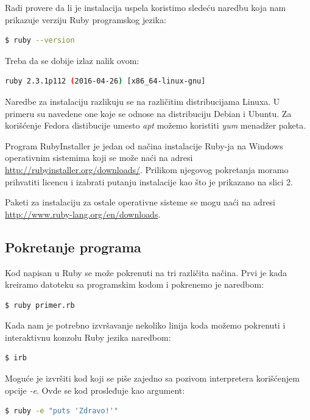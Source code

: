 \documentclass[a4paper]{article}
\begin{document}
Radi provere da li je instalacija uspela koristimo sledeću naredbu koja nam prikazuje verziju Ruby programskog jezika:

\begin{lstlisting}[language=bash]
  $ ruby --version
\end{lstlisting}\vspace*{-15pt}

Treba da se dobije izlaz nalik ovom:
\begin{lstlisting}[language=bash]
  ruby 2.3.1p112 (2016-04-26) [x86_64-linux-gnu]
\end{lstlisting}\vspace*{-15pt} 

Naredbe za instalaciju razlikuju se na različitim distribucijama Linuxa. U primeru su navedene one koje se odnose na distribuciju Debian i Ubuntu. Za korišćenje Fedora distibucije umesto \emph{apt} možemo koristiti \emph{yum} menadžer paketa.

Program RubyInstaller je jedan od načina instalacije Ruby-ja na Windows operativnim sistemima koji se može naći na adresi \url{http://rubyinstaller.org/downloads/}. Prilikom njegovog pokretanja moramo prihvatiti licencu i izabrati putanju instalacije kao što je prikazano na slici 2.

Paketi za instalaciju za ostale operativne sisteme se mogu naći na adresi \url{http://www.ruby-lang.org/en/downloads}.
\subsection{Pokretanje programa}
Kod napisan u Ruby se može pokrenuti na tri različita načina. Prvi je kada kreiramo datoteku sa programskim kodom i pokrenemo je naredbom:
\begin{lstlisting}[language=bash]
  $ ruby primer.rb
\end{lstlisting}\vspace*{-15pt}

Kada nam je potrebno izvršavanje nekoliko linija koda možemo pokrenuti i interaktivnu konzolu Ruby jezika naredbom:
\begin{lstlisting}[language=bash]
  $ irb
\end{lstlisting}\vspace*{-15pt}

Moguće je izvršiti kod koji se piše zajedno sa pozivom interpretera korišćenjem opcije \emph{-e}. Ovde se kod prosleđuje kao argument:
\begin{lstlisting}[language=bash]
  $ ruby -e "puts 'Zdravo!'"
\end{lstlisting}\vspace*{-15pt}
\end{document}
